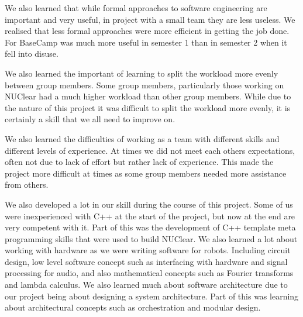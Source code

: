 \documentclass[english,12pt]{scrartcl}
\begin{document}
		We also learned that while formal approaches to software engineering are important and very useful, in project with a small team they are less useless.
		We realised that less formal approaches were more efficient in getting the job done.
		For BaseCamp was much more useful in semester 1 than in semester 2 when it fell into disuse.

		We also learned the important of learning to split the workload more evenly between group members.
		Some group members, particularly those working on NUClear had a much higher workload than other group members.
		While due to the nature of this project it was difficult to split the workload more evenly, it is certainly a skill that we all need to improve on.

		We also learned the difficulties of working as a team with different skills and different levels of experience.
		At times we did not meet each others expectations, often not due to lack of effort but rather lack of experience.
		This made the project more difficult at times as some group members needed more assistance from others.

		We also developed a lot in our skill during the course of this project.
		Some of us were inexperienced with C++ at the start of the project, but now at the end are very competent with it.
		Part of this was the development of C++ template meta programming skills that were used to build NUClear.
		We also learned a lot about working with hardware as we were writing software for robots.
		Including circuit design, low level software concept such as interfacing with hardware and signal processing for audio, and also mathematical concepts such as Fourier transforms and lambda calculus.
		We also learned much about software architecture due to our project being about designing a system architecture.
		Part of this was learning about architectural concepts such as orchestration and modular design.
		
		
\end{document}
